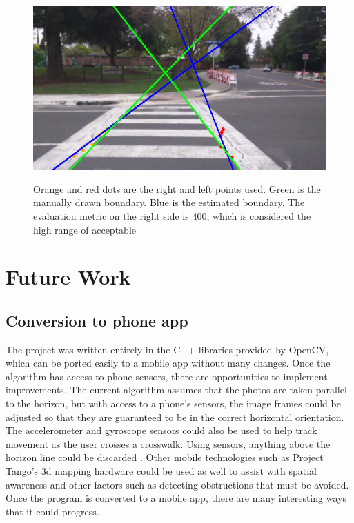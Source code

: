 \documentclass[12pt]{ucthesis}
\newcommand{\captionfonts}{\small\bf\ssp}
\begin{document}
\begin{figure}[H]
\begin{center}
\includegraphics[width=12cm]{400RightSide.png}
\captionfonts
\caption[Upper Limit of Boundary Line Metric]{Orange and red dots are the right and left points used. Green is the manually drawn boundary. Blue is the estimated boundary. The evaluation metric on the right side is 400, which is considered the high range of acceptable}
\label{fig:400Metric}
\end{center}
\end{figure}


\chapter{Future Work}
\label{future work}

\section{Conversion to phone app}

The project was written entirely in the C++ libraries provided by OpenCV, which can be ported easily to a mobile app without many changes. Once the algorithm has access to phone sensors, there are opportunities to implement improvements. The current algorithm assumes that the photos are taken parallel to the horizon, but with access to a phone's sensors, the image frames could be adjusted so that they are guaranteed to be in the correct horizontal orientation. The accelerometer and gyroscope sensors could also be used to help track movement as the user crosses a crosswalk. Using sensors, anything above the horizon line could be discarded \cite{Crosswatch2Lane}. Other mobile technologies such as Project Tango's 3d mapping hardware \cite{projectTango} could be used as well to assist with spatial awareness and other factors such as detecting obstructions that must be avoided. Once the program is converted to a mobile app, there are many interesting ways that it could progress.
\end{document}
